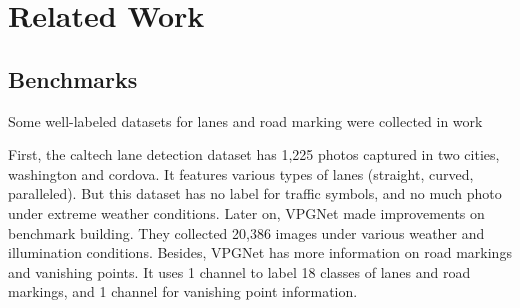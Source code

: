 \section{Related Work}

\subsection{Benchmarks}

Some well-labeled datasets for lanes and road marking were collected in work \cite{caltech, lee2017vpgnet}

First, the caltech lane detection dataset \cite{caltech} has 1,225 photos captured in two cities, washington and cordova. It features various types of lanes (straight, curved, paralleled). But this dataset has no label for traffic symbols, and no much photo under extreme weather conditions. Later on, VPGNet \cite{lee2017vpgnet} made improvements on benchmark building. They collected 20,386 images under various weather and illumination conditions. Besides, VPGNet has more information on road markings and vanishing points. It uses 1 channel to label 18 classes of lanes and road markings, and 1 channel for vanishing point information.